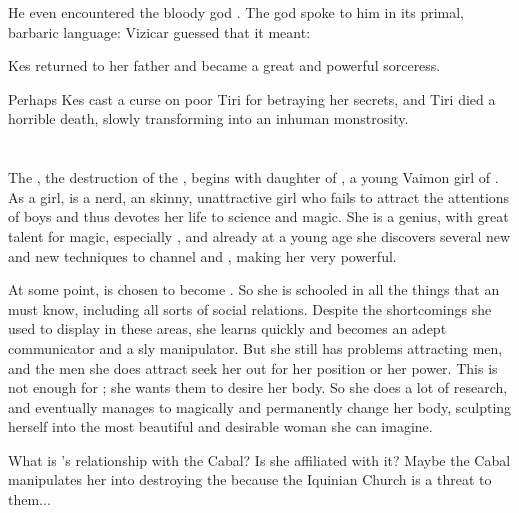 He even encountered the bloody god . 
The god spoke to him in its primal, barbaric language:
Vizicar guessed that it meant:

Kes returned to her father and became a great and powerful sorceress. 

Perhaps Kes cast a curse on poor Tiri for betraying her secrets, and Tiri died a horrible death, slowly transforming into an inhuman monstrosity. 





















\chapter{\HundredScourgesBook}
The \Darkfall, the destruction of the \VaimonCaliphate, begins with \Belzir{} daughter of \Cormin, a young Vaimon girl of \ClanGeican. As a girl, \Belzir{} is a nerd, an skinny, unattractive girl who fails to attract the attentions of boys and thus devotes her life to science and magic. She is a genius, with great talent for magic, especially \nieur{}, and already at a young age she discovers several new \qliphoth and new techniques to channel \iquin{} and \nieur{}, making her very powerful. 

At some point, \Belzir{} is chosen to become \Calipha. So she is schooled in all the things that an \Calipha must know, including all sorts of social relations. Despite the shortcomings she used to display in these areas, she learns quickly and becomes an adept communicator and a sly manipulator. But she still has problems attracting men, and the men she does attract seek her out for her position or her power. This is not enough for \Belzir; she wants them to desire her body. So she does a lot of research, and eventually manages to magically and permanently change her body, sculpting herself into the most beautiful and desirable woman she can imagine. 

What is \Belzir's relationship with the Cabal? Is she affiliated with it? Maybe the Cabal manipulates her into destroying the \caliphate because the Iquinian Church is a threat to them... 















